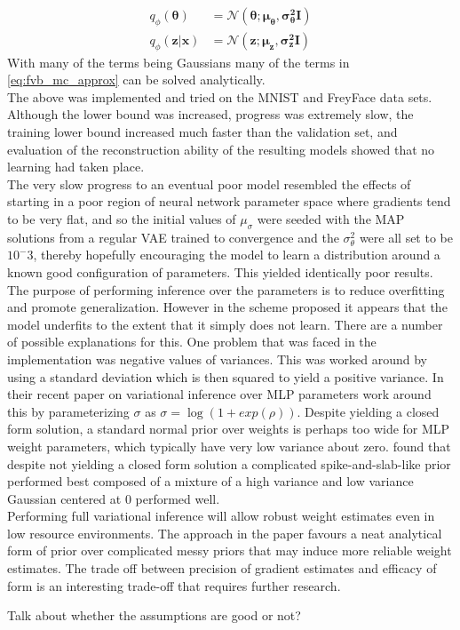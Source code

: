 \documentclass[../report.tex]{subfiles}
\begin{document}
\begin{equation}
\begin{split}
q_\phi(\mathbf{\theta}) & = \mathcal{N}(\mathbf{\theta}; \mathbf{\mu}_\mathbf{\theta}, \mathbf{\sigma^2_\theta}\mathbf{I})\\
q_\phi(\mathbf{z|x}) & = \mathcal{N}(\mathbf{z}; \mathbf{\mu}_\mathbf{z}, \mathbf{\sigma^2_z}\mathbf{I})
\end{split}
\end{equation}
With many of the terms being Gaussians many of the terms in \cref{eq:fvb_mc_approx} can be solved analytically.\\
The above was implemented and tried on the MNIST and FreyFace data sets. Although the lower bound was increased, progress was extremely slow, the training lower bound increased much faster than the validation set, and evaluation of the reconstruction ability of the resulting models showed that no learning had taken place.\\
The very slow progress to an eventual poor model resembled the effects of starting in a poor region of neural network parameter space where gradients tend to be very flat, and so the initial values of $\mu_\sigma$ were seeded with the MAP solutions from a regular VAE trained to convergence and the $\sigma_\theta^2$ were all set to be $10^-3$, thereby hopefully encouraging the model to learn a distribution around a known good configuration of parameters. This yielded identically poor results.\\
The purpose of performing inference over the parameters is to reduce overfitting and promote generalization. However in the scheme proposed it appears that the model underfits to the extent that it simply does not learn. There are a number of possible explanations for this. One problem that was faced in the implementation was negative values of variances. This was worked around by using a standard deviation which is then squared to yield a positive variance. In their recent paper on variational inference over MLP parameters \cite{blundell2015weight} work around this by parameterizing $\sigma$ as $\sigma = \log(1 + exp(\rho))$. Despite yielding a closed form solution, a standard normal prior over weights is perhaps too wide for MLP weight parameters, which typically have very low variance about zero. \cite{blundell2015weight} found that despite not yielding a closed form solution a complicated spike-and-slab-like prior performed best composed of a mixture of a high variance and low variance Gaussian centered at 0 performed well.\\
Performing full variational inference will allow robust weight estimates even in low resource environments. The approach in the paper favours a neat analytical form of prior over complicated messy priors that may induce more reliable weight estimates. The trade off between precision of gradient estimates and efficacy of form is an interesting trade-off that requires further research.



Talk about whether the assumptions are good or not?
\end{document}

